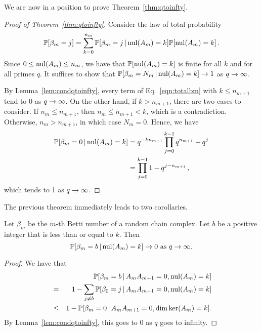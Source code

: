 We are now in a position to prove Theorem~\ref{thm:qtoinfty}.

\begin{proof}[Proof of Theorem~\ref{thm:qtoinfty}]
  Consider the law of total probability
  \begin{equation}
    \label{eqn:totalbm}
    \mathbb{P}[\beta_m = j] = \sum_{k=0}^{n_m} \mathbb{P}[\beta_m = j \,|\, \mathrm{nul}(A_m) = k]
    \mathbb{P}[\mathrm{nul}(A_m) = k] \, .
  \end{equation}
   Since $0 \leq \mathrm{nul}(A_m) \leq n_m$, we have that $\mathbb{P}[\mathrm{nul}(A_m) = k]$ is
   finite for all $k$ and for all primes $q$.  It suffices to show that 
   $\mathbb{P}[\beta_m =N_m \,|\, \mathrm{nul}(A_m) = k] \rightarrow 1$ as $q \rightarrow \infty$.
   
   By Lemma~\ref{lem:condqtoinfty}, every
   term of Eq.~\eqref{eqn:totalbm} with $k\leq n_{m+1}$ tend to 0 as $q \rightarrow \infty$.
   On the other hand, if $k>n_{m+1}$, there are two cases to consider.
   If $n_m \leq n_{m+1}$, then $n_m \leq n_{m+1} < k$, which is a contradiction.
   Otherwise, $n_m > n_{m+1}$, in which case $N_m = 0$. Hence, we have
   \begin{align*}
     \mathbb{P}[\beta_m = 0 \,|\, \mathrm{nul}(A_m) = k] &= q^{-k n_{m+1}} \prod_{j=0}^{k-1}q^{n_{m+1}}-q^j \\
     &= \prod_{j=0}^{k-1} 1 - q^{j-n_{m+1}} \, ,
   \end{align*}
   which tends to 1 as $q \rightarrow \infty$.
 \end{proof}




  



The previous theorem immediately leads to two corollaries.  

\begin{corollary}\label{condtozero}
Let $\beta_m$ be the $m$-th Betti number of a random chain complex. Let $b$ be a positive integer that is less than or equal to $k$. Then 
\[
\mathbb{P}[\beta_m = b \,|\, \mathrm{nul}(A_{m}) = k ] \to 0 \textrm{ as } q\to\infty.
\]
\end{corollary}
\begin{proof}
We have that
	\begin{eqnarray*}
	&&\mathbb{P}[\beta_m = b \,|\, A_{m}A_{m+1} = 0, \mathrm{nul}(A_{m}) = k ]\\
    &=& 1 - \sum_{j\neq b}\mathbb{P}[\beta_0 = j \,|\, A_{m}A_{m+1} = 0, \mathrm{nul}(A_{m}) = k ]\\
    &\leq& 1 - \mathbb{P}[\beta_m = 0 \,|\, A_{m}A_{m+1} = 0, \dim\ker(A_{m}) = k ].
	\end{eqnarray*}
By Lemma~\ref{lem:condqtoinfty}, this goes to $0$ as $q$ goes to infinity.
\end{proof}

